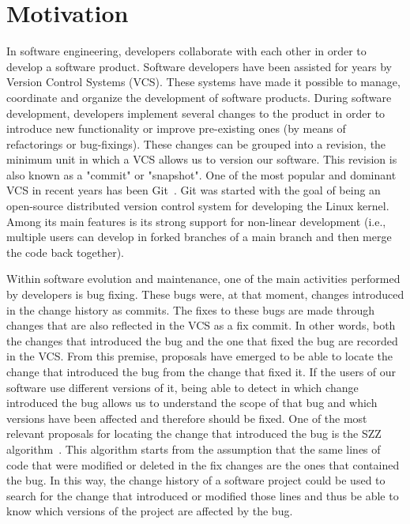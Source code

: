 \section{Motivation}

In software engineering, developers collaborate with each other in order to develop a software product. 
Software developers have been assisted for years by Version Control Systems (VCS). 
These systems have made it possible to manage, coordinate and organize the development of software products. 
During software development, developers implement several changes to the product in order to introduce new functionality or improve pre-existing ones (by means of refactorings or bug-fixings).
These changes can be grouped into a revision, the minimum unit in which a VCS allows us to version our software. 
This revision is also known as a "commit" or "snapshot".
One of the most popular and dominant VCS in recent years has been Git~\cite{VersionControlSystemSurvey:2022:Online}. 
Git was started with the goal of being an open-source distributed version control system for developing the Linux kernel.
Among its main features is its strong support for non-linear development (i.e., multiple users can develop in forked branches of a main branch and then merge the code back together).

Within software evolution and maintenance, one of the main activities performed by developers is bug fixing. 
These bugs were, at that moment, changes introduced in the change history as commits.
The fixes to these bugs are made through changes that are also reflected in the VCS as a fix commit. 
In other words, both the changes that introduced the bug and the one that fixed the bug are recorded in the VCS. 
From this premise, proposals have emerged to be able to locate the change that introduced the bug from the change that fixed it. 
If the users of our software use different versions of it, being able to detect in which change introduced the bug allows us to understand the scope of that bug and which versions have been affected and therefore should be fixed.
One of the most relevant proposals for locating the change that introduced the bug is the SZZ algorithm~\cite{Sliwerski:2005:CIF:1083142.1083147}. 
This algorithm starts from the assumption that the same lines of code that were modified or deleted in the fix changes are the ones that contained the bug. 
In this way, the change history of a software project could be used to search for the change that introduced or modified those lines and thus be able to know which versions of the project are affected by the bug.


